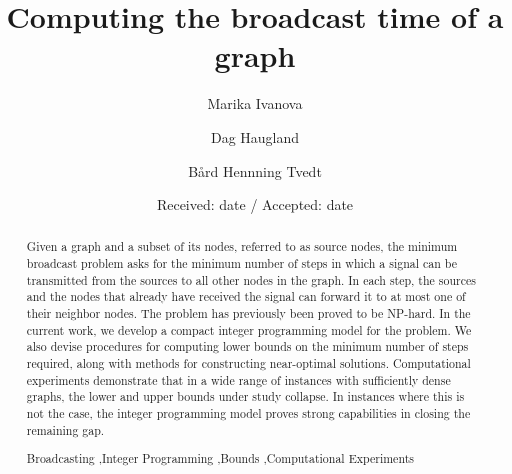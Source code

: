 \documentclass[preprint,12pt, review]{elsarticle}
\begin{document}
\begin{frontmatter}

\title{Computing the broadcast time of a graph}

\author{Marika Ivanova}
\address{Department of Theoretical Computer Science and Mathematical Logic, Charles University, Prague, Czech Republic}

\author{Dag Haugland}

\address{Department of Informatics, University of Bergen, Norway}

\author{B{\aa}rd Hennning Tvedt}

\address{Department of Physics, University of Bergen, Norway}


\date{Received: date / Accepted: date}

\begin{abstract}
Given a graph and a subset of its nodes, referred to as source nodes, the minimum broadcast problem asks for the minimum number of steps in which a signal can be transmitted from the sources to all other nodes in the graph.
In each step, the sources and the nodes that already have received the signal can forward it to at most one of their neighbor nodes.
The problem has previously been proved to be NP-hard. 
In the current work, we develop a compact integer programming model for the problem.
We also devise procedures for computing lower bounds on the minimum number of steps required, along with methods for constructing near-optimal solutions.
Computational experiments demonstrate that in a wide range of instances with sufficiently dense graphs, the lower and upper bounds under study collapse.
In instances where this is not the case, the integer programming model proves strong capabilities in closing the remaining gap.

\begin{keyword}
Broadcasting \sep Integer Programming \sep Bounds \sep Computational Experiments
\end{keyword}
\end{abstract}
\end{frontmatter}








\end{document}
